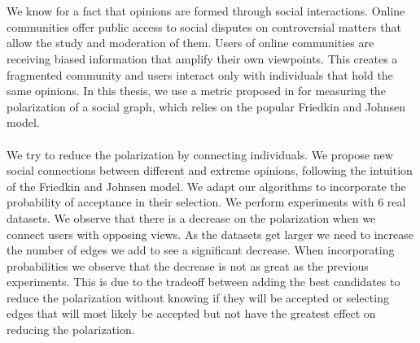 \chapter*{\abstractname}
\addstarredchapter{\abstractname} %

\noindent We know for a fact that opinions are formed through social interactions. Online communities offer public access to social disputes on controversial matters that allow the study and moderation of them.
Users of online communities are receiving biased information that amplify their own viewpoints. This creates a fragmented community and users interact only with individuals that hold the same opinions. In this thesis, we use a metric proposed in \cite{tsapMatakosTerzi} for measuring the polarization of a social graph, which relies on the popular Friedkin and Johnsen model. 
\\
\\We try to reduce the polarization by connecting individuals. We propose new social connections between different and extreme opinions, following the intuition of the Friedkin and Johnsen model. 
We adapt our algorithms to incorporate the probability of acceptance in their selection. We perform experiments with 6 real datasets. We observe that there is a decrease on the polarization when we connect users with opposing views. As the datasets get larger we need to increase the number of edges we add to see a  significant decrease. When incorporating probabilities we observe that the decrease is not as great as the previous experiments. This is due to the tradeoff between adding the best candidates to reduce the polarization without knowing if they will be accepted or selecting edges that will most likely be accepted but not have the greatest effect on reducing the polarization.

\bigskip
